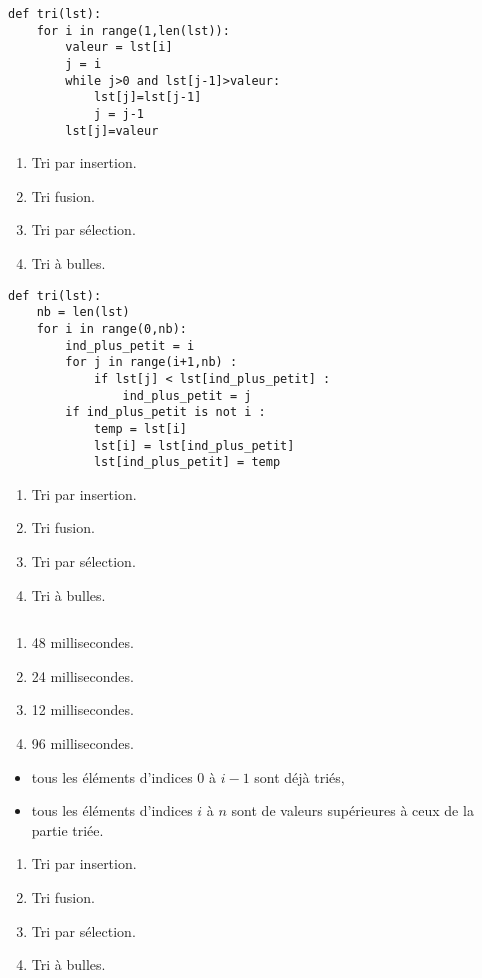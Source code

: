\begin{lstlisting}
def tri(lst):
    for i in range(1,len(lst)):
        valeur = lst[i]
        j = i
        while j>0 and lst[j-1]>valeur:
            lst[j]=lst[j-1]
            j = j-1
        lst[j]=valeur
\end{lstlisting}
\begin{enumerate}
\item Tri par insertion. %
\item Tri fusion.
\item Tri par sélection.
\item Tri à bulles.
\end{enumerate}

\begin{lstlisting}
def tri(lst):
    nb = len(lst)
    for i in range(0,nb):    
        ind_plus_petit = i
        for j in range(i+1,nb) :
            if lst[j] < lst[ind_plus_petit] :
                ind_plus_petit = j
        if ind_plus_petit is not i :
            temp = lst[i]
            lst[i] = lst[ind_plus_petit]
            lst[ind_plus_petit] = temp
\end{lstlisting}
\begin{enumerate}
\item Tri par insertion. 
\item Tri fusion.
\item Tri par sélection. %
\item Tri à bulles.
\end{enumerate}

\begin{lstlisting}
\end{lstlisting}
\begin{enumerate}
\item 48 millisecondes. %
\item 24 millisecondes.
\item 12 millisecondes.
\item 96 millisecondes.
\end{enumerate}

\begin{itemize}
\item tous les éléments d'indices 0 à $i-1$ sont déjà triés,
\item tous les éléments d'indices $i$ à $n$ sont de valeurs supérieures à ceux de la partie triée.
\end{itemize}
\begin{enumerate}
\item Tri par insertion. 
\item Tri fusion.
\item Tri par sélection. %
\item Tri à bulles.
\end{enumerate}

